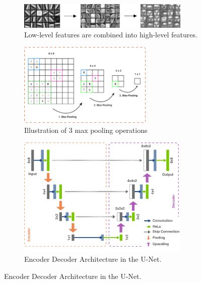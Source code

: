 \begin{figure}
    \begin{subfigure}{1\textwidth}
        \centering
        \includegraphics[width=0.9\textwidth]{resources/images/abstraction.png}
        \caption{Low-level features are combined into high-level features.}
        \label{fig: abstraction}
    \end{subfigure}
    \begin{subfigure}{\textwidth}
        \centering
        \vspace{0.5cm}
        \includegraphics[width=0.7\textwidth]{resources/images/max_pooling.png}
        \caption{Illustration of 3 max pooling operations}
        \label{fig: max_pooling}
    \end{subfigure}
    \begin{subfigure}{\textwidth}
        \centering
        \vspace{0.5cm}
        \includegraphics[width=0.9\textwidth]{resources/images/u_net.png}
        \caption{Encoder Decoder Architecture in the U-Net.}
        \label{fig: u_net}
    \end{subfigure}
\end{figure}

